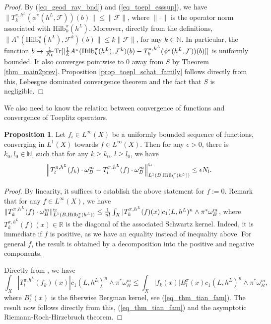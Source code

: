 \documentclass[12pt]{article}
\numberwithin{equation}{section}
\theoremstyle{theorem}
\theoremstyle{definition}
\newtheorem{prop}[thm]{Proposition}
\theoremstyle{remark}
\newcommand{\real}{\mathbb{R}}
\newcommand{\nat}{\mathbb{N}}
\begin{document}
	\begin{sloppypar}
	\begin{proof}
		By (\ref{eq_geod_ray_bnd}) and (\ref{eq_toepl_esssup}), we have $\| T^{\pi, h^L}_{k}(\phi^{\pi}(h^L, \mathcal{F}))(b) \| \leq \| \mathcal{F} \|$, where $\| \cdot \|$ is the operator norm associated with ${\textrm{Hilb}}^{\pi}_k(h^L)$.
		Moreover, directly from the definitions, $\| A^{\pi}({\textrm{Hilb}}^{\pi}_k(h^L), \mathcal{F}^k)(b) \| \leq k \| \mathcal{F} \|$, for any $k \in \nat$.
		In particular, the function $b \mapsto \frac{1}{N_k}
			{\rm{Tr}}[|
				\frac{1}{k} A^{\pi}({\textrm{Hilb}}^{\pi}_k(h^L), \mathcal{F}^k)(b)
				-
				T^{\pi, h^L}_{k}(\phi^{\pi}(h^L, \mathcal{F}))(b)|]$ is uniformly bounded.
		It also converges pointwise to $0$ away from $S$ by Theorem \ref{thm_main2prev}.
		Proposition \ref{prop_toepl_schat_family} follows directly from this, Lebesgue dominated convergence theorem and the fact that $S$ is negligible.
	\end{proof}
	\end{sloppypar}
	We also need to know the relation between convergence of functions and convergence of Toeplitz operators.
	\begin{prop}\label{prop_approx_toepl}
		Let $f_i \in L^{\infty}(X)$ be a uniformly bounded sequence of functions, converging in $L^1(X)$ towards $f \in L^{\infty}(X)$.
		Then for any $\epsilon > 0$, there is $k_0, l_0 \in \nat$, such that for any $k \geq k_0$, $l \geq l_0$, we have
		\begin{equation}
			\Big\| 
				T^{\pi, h^L}_{l}(f_k)  \cdot \omega_B^m
				-
				T^{\pi, h^L}_{l}(f)  \cdot \omega_B^m
			\Big\|_{L^1(B, {\textrm{Hilb}}^{\pi}_l(h^L))}^{{\rm{tr}}}
			\leq
			\epsilon N_l.
		\end{equation}
	\end{prop}
	\begin{proof}
		By linearity, it suffices to establish the above statement for $f := 0$.
		Remark that for any $f \in L^{\infty}(X)$, we have $\| T^{\pi, h^L}_{k}(f)  \cdot \omega_B^m \|_{L^1(B, {\textrm{Hilb}}^{\pi}_k(h^L))}^{{\rm{tr}}} \leq \frac{1}{n!} \int_{X} | T_k^{\pi, h^L}(f)(x) | c_1(L, h^L)^n \wedge \pi^* \omega_B^m$, where $T_k^{\pi, h^L}(f)(x) \in \real$ is the diagonal of the associated Schwartz kernel.
		Indeed, it is immediate if $f$ is positive, as we have an equality instead of inequality above.
		For general $f$, the result is obtained by a decomposition into the positive and negative components.
		\par 
		Directly from \cite[(5.14)]{FinSubmToepl}, we have
		\begin{equation}
			\int_{X} | T_l^{\pi, h^L}(f_k)(x) | c_1(L, h^L)^n \wedge \pi^* \omega_B^m
			\leq
			\int_{X} |f_k(x)| B_l^{\pi}(x) c_1(L, h^L)^n \wedge \pi^* \omega_B^m,
		\end{equation}
		where $B_l^{\pi}(x)$ is the fiberwise Bergman kernel, see (\ref{eq_thm_tian_fam}).
		The result now follows directly from this, (\ref{eq_thm_tian_fam}) and the asymptotic Riemann-Roch-Hirzebruch theorem.
	\end{proof}
\end{document}
